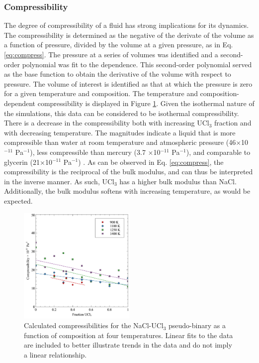 \documentclass[preprint,3p,10pt,onecolumn,number,sort&compress]{elsarticle}
\begin{document}
{\FloatBarrier

\subsubsection{Compressibility}

The degree of compressibility of a fluid has strong implications for its dynamics. The compressibility is determined as the negative of the derivate of the volume as a function of pressure, divided by the volume at a given pressure, as in Eq. \ref{eq:compress}. The pressure at a series of volumes was identified and a second-order polynomial was fit to the dependence. This second-order polynomial served as the base function to obtain the derivative of the volume with respect to pressure. The volume of interest is identified as that at which the pressure is zero for a given temperature and composition. The temperature and composition-dependent compressibility is displayed in Figure \ref{fig:compress}. Given the isothermal nature of the simulations, this data can be considered to be isothermal compressibility. There is a decrease in the compressibility both with increasing UCl$_3$ fraction and with decreasing temperature. The magnitudes indicate a liquid that is more compressible than water at room temperature and atmospheric pressure (46$\times$10$^{-11}$ Pa$^{-1}$), less compressible than mercury (3.7 $\times$10$^{-11}$ Pa$^{-1}$), and comparable to glycerin (21$\times$10$^{-11}$ Pa$^{-1}$) \cite{aiphandbook}. As can be observed in Eq. \ref{eq:compress}, the compressibility is the reciprocal of the bulk modulus, and can thus be interpreted in the inverse manner. As such, UCl$_3$ has a higher bulk modulus than NaCl. Additionally, the bulk modulus softens with increasing temperature, as would be expected. 

\begin{figure}[htb]
\centering
\includegraphics[width=0.5\textwidth]{figbulk.jpg}
\caption{Calculated compressibilities for the NaCl-UCl{$_3$} pseudo-binary as a function of composition at four temperatures. Linear fits to the data are included to better illustrate trends in the data and do not imply a linear relationship.} 
\label{fig:compress}
\end{figure}

}
\end{document}
